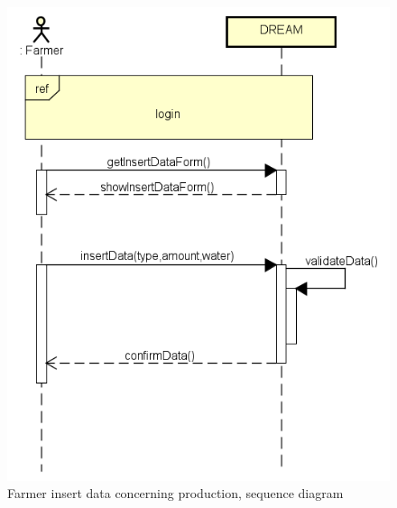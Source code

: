 \bigskip
\begin{figure}[H]
    \centering
    \includegraphics[scale=0.7]{Images/FarmerInsertsDataSequence.png}
    \caption{Farmer insert data concerning production, sequence diagram}
\end{figure}

